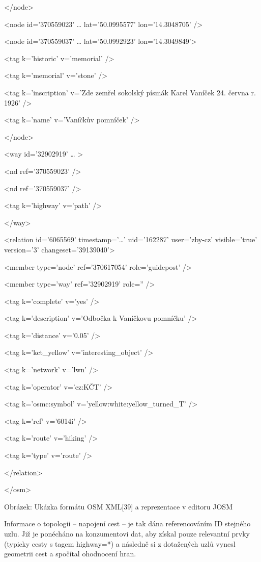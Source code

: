  </node>

  <node id='370559023' … lat='50.0995577' lon='14.3048705' />



 <node id='370559037' … lat='50.0992923' lon='14.3049849'>

    <tag k='historic' v='memorial' />

    <tag k='memorial' v='stone' />

   <tag k='inscription' v='Zde zemřel sokolský písmák Karel Vaníček 24. června r. 1926' />

   <tag k='name' v='Vaníčkův pomníček' />

 </node>



 <way id='32902919' … >

   <nd ref='370559023' />

   <nd ref='370559037' />

   <tag k='highway' v='path' />

 </way>



 <relation id='6065569' timestamp='…' uid='162287' user='zby-cz' visible='true' version='3' changeset='39139040'>

   <member type='node' ref='370617054' role='guidepost' />

   <member type='way' ref='32902919' role='' />

   <tag k='complete' v='yes' />

   <tag k='description' v='Odbočka k Vaníčkovu pomníčku' />

   <tag k='distance' v='0.05' />

   <tag k='kct\_yellow' v='interesting\_object' />

   <tag k='network' v='lwn' />

   <tag k='operator' v='cz:KČT' />

   <tag k='osmc:symbol' v='yellow:white:yellow\_turned\_T' />

   <tag k='ref' v='6014i' />

   <tag k='route' v='hiking' />

   <tag k='type' v='route' />

 </relation>

</osm>

Obrázek: Ukázka formátu OSM XML[39] a reprezentace v editoru JOSM

Informace o topologii – napojení cest – je tak dána referencováním ID stejného uzlu. Již je ponécháno na konzumentovi dat, aby získal pouze relevantní prvky (typicky cesty s tagem highway=*) a následně si z dotažených uzlů vynesl geometrii cest a spočítal ohodnocení hran.

